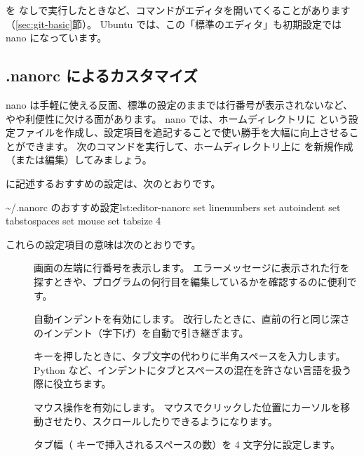  を  なしで実行したときなど、コマンドがエディタを開いてくることがあります（\ref{sec:git-basic}節）。
Ubuntu では、この「標準のエディタ」も初期設定では nano になっています。

\subsection{.nanorc によるカスタマイズ}

nano は手軽に使える反面、標準の設定のままでは行番号が表示されないなど、やや利便性に欠ける面があります。
nano では、ホームディレクトリに  という設定ファイルを作成し、設定項目を追記することで使い勝手を大幅に向上させることができます。
次のコマンドを実行して、ホームディレクトリ上に  を新規作成（または編集）してみましょう。


 に記述するおすすめの設定は、次のとおりです。

\begin{codelisting}[style=bash]{\textasciitilde/.nanorc のおすすめ設定}{lst:editor-nanorc}
set linenumbers
set autoindent
set tabstospaces
set mouse
set tabsize 4
\end{codelisting}

これらの設定項目の意味は次のとおりです。

\begin{description}
  \item[]
    画面の左端に行番号を表示します。
    エラーメッセージに表示された行を探すときや、プログラムの何行目を編集しているかを確認するのに便利です。
  \item[]
    自動インデントを有効にします。
    改行したときに、直前の行と同じ深さのインデント（字下げ）を自動で引き継ぎます。
  \item[]
     キーを押したときに、タブ文字の代わりに半角スペースを入力します。
    Python など、インデントにタブとスペースの混在を許さない言語を扱う際に役立ちます。
  \item[]
    マウス操作を有効にします。
    マウスでクリックした位置にカーソルを移動させたり、スクロールしたりできるようになります。
  \item[]
    タブ幅（ キーで挿入されるスペースの数）を 4 文字分に設定します。
\end{description}

